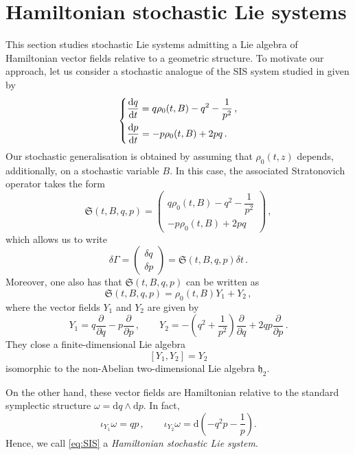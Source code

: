 \documentclass[11pt]{article}
\theoremstyle{plain}
\theoremstyle{definition}
\renewcommand{\d}{\mathrm{d}}
\def\d{\mathrm{d}}
\begin{document}
 

 

\section{Hamiltonian stochastic Lie systems}\label{Sec:Hamiltonian_Stochastic_Lie_Systems}

This section studies stochastic Lie systems admitting a Lie algebra of Hamiltonian vector fields relative to a geometric structure. To motivate our approach, let us consider a stochastic analogue of the SIS system studied in \cite{EFSZ22} given by
\begin{equation}\label{eq:SIS}
\begin{dcases}
 \dfrac{\d q}{\d t} = q\rho_0(t,B)-q^2-\frac{1}{p^2}\,,\\
 \dfrac{\d p}{\d t} = -p\rho_0(t,B)+2pq\,.
\end{dcases}
\end{equation}
Our stochastic generalisation is obtained by assuming that $\rho_0(t,z)$ depends, additionally, on a stochastic variable $B$. In this case,  the associated Stratonovich operator takes the form
$$
\mathfrak{S}(t,B,q,p)=\begin{pmatrix} q\rho_0(t,B)-q^2-\dfrac{1}{p^2}\\-p\rho_0(t,B)+2pq \end{pmatrix}\,,
$$
which allows us to write
$$
\delta\Gamma= \begin{pmatrix} \delta q\\\delta p \end{pmatrix} = \mathfrak{S}(t,B,q,p)\delta t\,.
$$
Moreover, one also has that $\mathfrak{S}(t,B,q,p)$ can be written as
$$
\mathfrak{S}(t,B,q,p)=\rho_0(t,B)Y_1+Y_2\,,
$$
where the vector fields $Y_1$ and $Y_2$ are given by
$$
Y_1=q\frac{\partial}{\partial q}-p\frac{\partial}{\partial p}\,,\qquad Y_2=-\left(q^2+\frac{1}{p^2}\right)\frac{\partial}{\partial q}+2qp\frac{\partial}{\partial p}\,.
$$
They close a finite-dimensional Lie algebra
$$
[Y_1,Y_2]=Y_2
$$
isomorphic to the non-Abelian two-dimensional Lie algebra $\mathfrak{h}_2$.

On the other hand, these vector fields are Hamiltonian relative to the standard symplectic structure
$\omega = \d q\wedge \d p$. In fact,
$$
\iota_{Y_1}\omega=qp\,,\qquad \iota_{Y_2}\omega = \d\left(-q^2p-\frac{1}{p}\right).
$$
Hence, we call \eqref{eq:SIS} a {\it Hamiltonian stochastic Lie system}.
\end{document}
